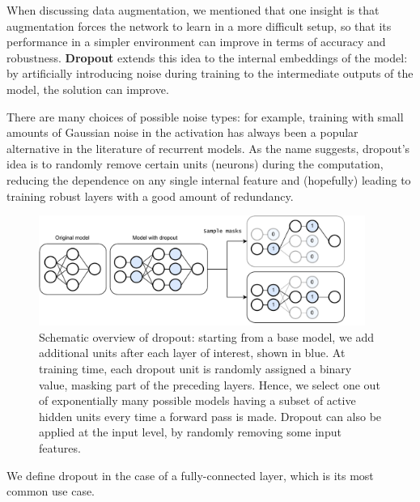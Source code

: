 When discussing data augmentation, we mentioned that one insight is that augmentation forces the network to learn in a more difficult setup, so that its performance in a simpler environment can improve in terms of accuracy and robustness. \textbf{Dropout} \cite{srivastava2014dropout} extends this idea to the internal embeddings of the model: by artificially introducing noise during training to the intermediate outputs of the model, the solution can improve.

There are many choices of possible noise types: for example, training with small amounts of Gaussian noise in the activation has always been a popular alternative in the literature of recurrent models. As the name suggests, dropout's idea is to randomly remove certain units (neurons) during the computation, reducing the dependence on any single internal feature and (hopefully) leading to training robust layers with a good amount of redundancy.

\begin{figure}
    \centering
    \includegraphics[width=0.95\textwidth]{images/dropout}
    \caption{Schematic overview of dropout: starting from a base model, we add additional units after each layer of interest, shown in blue. At training time, each dropout unit is randomly assigned a binary value, masking part of the preceding layers. Hence, we select one out of exponentially many possible models having a subset of active hidden units every time a forward pass is made. Dropout can also be applied at the input level, by randomly removing some input features.}
    \label{fig:dropout}
\end{figure}

We define dropout in the case of a fully-connected layer, which is its most common use case. 

